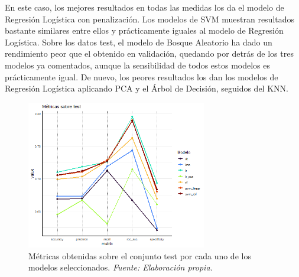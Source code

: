\documentclass[12pt,a4paper,]{book}
\numberwithin{dummy}{section}
\theoremstyle{ocrenumbox}
\theoremstyle{blacknumex}
\theoremstyle{blacknumbox}
\theoremstyle{ocrenum}
\theoremstyle{ocrenum}
\begin{document}
En este caso, los mejores resultados en todas las medidas los da el
modelo de Regresión Logística con penalización. Los modelos de SVM
muestran resultados bastante similares entre ellos y prácticamente
iguales al modelo de Regresión Logística. Sobre los datos test, el
modelo de Bosque Aleatorio ha dado un rendimiento peor que el obtenido
en validación, quedando por detrás de los tres modelos ya comentados,
aunque la sensibilidad de todos estos modelos es prácticamente igual. De
nuevo, los peores resultados los dan los modelos de Regresión Logística
aplicando PCA y el Árbol de Decisión, seguidos del KNN.

\begin{table}[H]
\centering
{}
\caption[Métricas sobre el conjunto test]{Métricas sobre el conjunto test. \it Fuente: Elaboración propia.}
\label{tab:metricas_test}
\end{table}

\begin{figure}[H]
\centering
\includegraphics[width =0.7\textwidth]{graficos/test_metrics.png}
\caption[Gráfico de métricas obtenidas sobre el conjunto test]{Métricas obtenidas sobre el conjunto test por cada uno de los modelos seleccionados. \it Fuente: Elaboración propia.}
\label{fig:test_metrics}
\end{figure}
\end{document}
